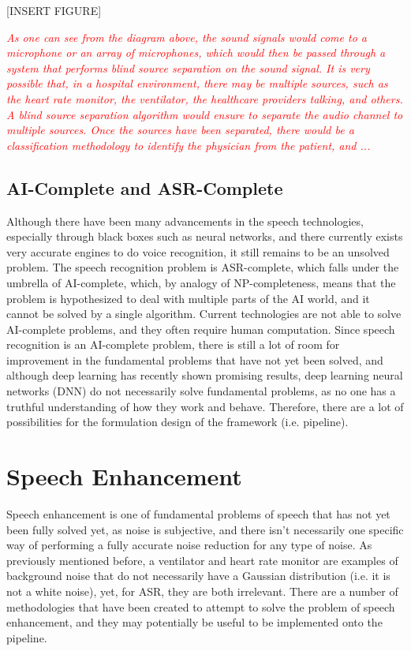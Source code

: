 [INSERT FIGURE]


\textcolor{red}{\textit{As one can see from the diagram above, the sound signals would come to a microphone or an array of microphones, which would then be passed through a system that performs blind source separation on the sound signal. It is very possible that, in a hospital environment, there may be multiple sources, such as the heart rate monitor, the ventilator, the healthcare providers talking, and others. A blind source separation algorithm would ensure to separate the audio channel to multiple sources. Once the sources have been separated, there would be a classification methodology to identify the physician from the patient, and ...}}

\subsection{AI-Complete and ASR-Complete}
Although there have been many advancements in the speech technologies, especially through black boxes such as neural networks, and there currently exists very accurate engines to do voice recognition, it still remains to be an unsolved problem. The speech recognition problem is ASR-complete, which falls under the umbrella of AI-complete, which, by analogy of NP-completeness, means that the problem is hypothesized to deal with multiple parts of the AI world, and it cannot be solved by a single algorithm. Current technologies are not able to solve AI-complete problems, and they often require human computation. Since speech recognition is an AI-complete problem, there is still a lot of room for improvement in the fundamental problems that have not yet been solved, and although deep learning has recently shown promising results, deep learning neural networks (DNN) do not necessarily solve fundamental problems, as no one has a truthful understanding of how they work and behave. Therefore, there are a lot of possibilities for the formulation design of the framework (i.e. pipeline).

\section{Speech Enhancement}
Speech enhancement is one of fundamental problems of speech that has not yet been fully solved yet, as noise is subjective, and there isn't necessarily one specific way of performing a fully accurate noise reduction for any type of noise. As previously mentioned before, a ventilator and heart rate monitor are examples of background noise that do not necessarily have a Gaussian distribution (i.e. it is not a white noise), yet, for ASR, they are both irrelevant. There are a number of methodologies that have been created to attempt to solve the problem of speech enhancement, and they may potentially be useful to be implemented onto the pipeline.

